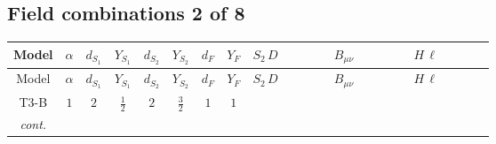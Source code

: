 \documentclass[8pt]{article}
\begin{document}
\begin{landscape}
\subsection*{Field combinations 2 of 8}
\begin{longtable}{@{}cccccccc >{\raggedright\arraybackslash}p{0.21\linewidth} >{\raggedright\arraybackslash}p{0.21\linewidth} >{\raggedright\arraybackslash}p{0.21\linewidth}@{}}
\toprule
Model & $\alpha$ & $d_{S_1}$ & $Y_{S_1}$ & $d_{S_2}$ & $Y_{S_2}$ & $d_F$ & $Y_F$ & $S_2\,D$ & $B_{\mu\nu}$ & $H\,\ell$ \\
\midrule
\endfirsthead
\toprule
Model & $\alpha$ & $d_{S_1}$ & $Y_{S_1}$ & $d_{S_2}$ & $Y_{S_2}$ & $d_F$ & $Y_F$ & $S_2\,D$ & $B_{\mu\nu}$ & $H\,\ell$ \\
\midrule
\endhead
T3-B & $1$ & $2$ & $\frac{1}{2}$ & $2$ & $\frac{3}{2}$ & $1$ & $1$ & \scriptsize\adjustbox{max width=\linewidth}{$\begin{gathered} +D_{\mu _1}\left(S_{2,j_1}\right){}^{\dagger } D_{\mu _1}\left(S_{2,j_1}\right)\end{gathered}$} & \scriptsize\adjustbox{max width=\linewidth}{$\begin{gathered} -\frac{\hbar  B_{\mu _1\mu _2}^2}{\epsilon }\end{gathered}$} & \scriptsize\adjustbox{max width=\linewidth}{$\begin{gathered} +\frac{2 \hbar  \overline{y_{1,i_1,r_1}} \overline{y_{2,i_2,r_1}} L_{a_4,i_2}{}^T\, C\, P_L\, L_{a_2,i_1} H_{a_1} H_{a_3} \lambda_5 \epsilon_{a_1,a_2} \epsilon_{a_3,a_4}}{\sqrt{3} \epsilon  M_F} \\ +\frac{2 \hbar  \overline{y_{1,i_1,r_1}} \overline{y_{2,i_2,r_1}} L_{a_4,i_2}{}^T\, C\, P_L\, L_{a_2,i_1} H_{a_1} H_{a_3} \lambda_5 \epsilon_{a_1,a_2} \epsilon_{a_3,a_4}}{\sqrt{3} M_F} \\ +\frac{2 \hbar  \overline{\lambda_5} \overline{L_{a_3,i_1}}\, C\, P_R\, \overline{L_{a_4,i_2}}{}^T y_{1,i_1,r_1} y_{2,i_2,r_1} \epsilon_{a_1,a_3} \epsilon_{a_2,a_4} H_{a_1}{}^{\dagger } H_{a_2}{}^{\dagger }}{\sqrt{3} \epsilon  M_F}\end{gathered}$} \\
\textit{cont.} &  &  &  &  &  &  &  &  &  & \scriptsize\adjustbox{max width=\linewidth}{$\begin{gathered} +\frac{2 \hbar  \overline{\lambda_5} \overline{L_{a_3,i_1}}\, C\, P_R\, \overline{L_{a_4,i_2}}{}^T y_{1,i_1,r_1} y_{2,i_2,r_1} \epsilon_{a_1,a_3} \epsilon_{a_2,a_4} H_{a_1}{}^{\dagger } H_{a_2}{}^{\dagger }}{\sqrt{3} M_F}\end{gathered}$} \\
\midrule
\bottomrule
\end{longtable}
\clearpage

\end{landscape}
\end{document}
